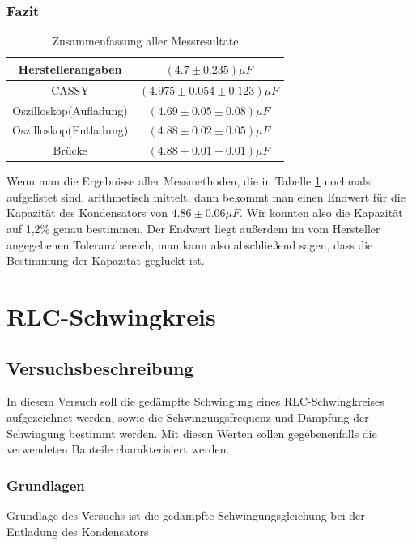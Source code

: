 \documentclass[12pt,a4paper]{article}
\begin{document}
\subsubsection{Fazit}
\begin{table}[H]
\begin{center}
\begin{tabular}{|c|c|}
\hline 
Herstellerangaben & $(4.7\pm0.235)\mu F$\\ 
\hline 
CASSY & $(4.975\pm 0.054\pm0.123)\mu F$\\
\hline 
Oszilloskop(Aufladung) & $(4.69\pm 0.05\pm 0.08)\mu F$ \\ 
\hline 
Oszilloskop(Entladung) & $(4.88\pm 0.02\pm 0.05)\mu F$ \\ 
\hline 
Brücke & $(4.88\pm0.01\pm0.01)\mu F$ \\ 
\hline 
\end{tabular} 
\end{center}
\caption{Zusammenfassung aller Messresultate}
\label{tab:kondzusammenfassung}
\end{table}
Wenn man die Ergebnisse aller Messmethoden, die in Tabelle \ref{tab:kondzusammenfassung} nochmals aufgelistet sind, arithmetisch mittelt, dann bekommt man einen Endwert für die Kapazität des Kondensators von $4.86\pm 0.06 \mu F$. Wir konnten also die Kapazität auf 1,2\% genau bestimmen. Der Endwert liegt außerdem im vom Hersteller angegebenen Toleranzbereich, man kann also abschließend sagen, dass die Bestimmung der Kapazität geglückt ist.

\newpage
\section{RLC-Schwingkreis}
\subsection{Versuchsbeschreibung}

In diesem Versuch soll die gedämpfte Schwingung eines RLC-Schwingkreises aufgezeichnet werden, sowie die Schwingungsfrequenz und Dämpfung der Schwingung bestimmt werden.
Mit diesen Werten sollen gegebenenfalls die verwendeten Bauteile charakterisiert werden.

\subsubsection{Grundlagen}
Grundlage des Versuchs ist die gedämpfte Schwingungsgleichung bei der Entladung des Kondensators
\end{document}
